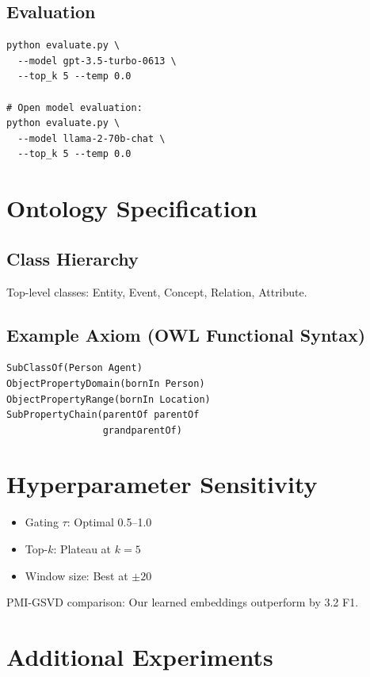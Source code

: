 \documentclass[10pt,twocolumn]{article}
\begin{document}
\subsection{Evaluation}
\begin{verbatim}
python evaluate.py \
  --model gpt-3.5-turbo-0613 \
  --top_k 5 --temp 0.0

# Open model evaluation:
python evaluate.py \
  --model llama-2-70b-chat \
  --top_k 5 --temp 0.0
\end{verbatim}

\section{Ontology Specification}
\label{app:ontology}

\subsection{Class Hierarchy}
Top-level classes: Entity, Event, Concept, Relation, Attribute.

\subsection{Example Axiom (OWL Functional Syntax)}
\begin{verbatim}
SubClassOf(Person Agent)
ObjectPropertyDomain(bornIn Person)
ObjectPropertyRange(bornIn Location)
SubPropertyChain(parentOf parentOf 
                 grandparentOf)
\end{verbatim}

\section{Hyperparameter Sensitivity}
\label{app:hyper}

\begin{itemize}
    \item Gating $\tau$: Optimal 0.5--1.0
    \item Top-$k$: Plateau at $k=5$
    \item Window size: Best at $\pm20$
\end{itemize}

PMI-GSVD comparison: Our learned embeddings outperform by 3.2 F1.

\section{Additional Experiments}
\label{app:extra}
\end{document}
